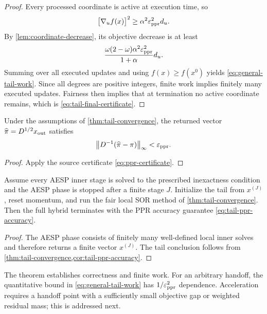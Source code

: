 \begin{proof}
Every processed coordinate is active at execution time, so
\begin{equation}
    \bigl[\nabla_u f(x)\bigr]^2\geq\alpha^2\varepsilon_{\mathrm{ppr}}^2d_u.
    \label{eq:active-square}
\end{equation}
By \cref{lem:coordinate-decrease}, its objective decrease is at least
\[
    \frac{\omega(2-\omega)\alpha^2\varepsilon_{\mathrm{ppr}}^2}{1+\alpha}d_u.
\]
Summing over all executed updates and using \(f(x)\geq f(x^0)\) yields
\cref{eq:general-tail-work}.  Since all degrees are positive integers, finite
work implies finitely many executed updates.  Fairness then implies that at
termination no active coordinate remains, which is
\cref{eq:tail-final-certificate}.
\end{proof}

\begin{corollary}
\label{cor:tail-ppr-accuracy}
Under the assumptions of \cref{thm:tail-convergence}, the returned vector
\(\widehat\pi=D^{1/2}x_{\rm out}\) satisfies
\begin{equation}
    \left\lVert D^{-1}(\widehat\pi-\pi)\right\rVert_\infty<\varepsilon_{\mathrm{ppr}}.
    \label{eq:tail-ppr-accuracy}
\end{equation}
\end{corollary}

\begin{proof}
Apply the source certificate \cref{eq:ppr-certificate}.
\end{proof}

\begin{theorem}
\label{thm:hybrid-convergence}
Assume every AESP inner stage is solved to the prescribed inexactness
condition and the AESP phase is stopped after a finite stage \(J\).  Initialize
the tail from \(x^{(J)}\), reset momentum, and run the fair local SOR method of
\cref{thm:tail-convergence}.  Then the full hybrid terminates with the PPR
accuracy guarantee \cref{eq:tail-ppr-accuracy}.
\end{theorem}

\begin{proof}
The AESP phase consists of finitely many well-defined local inner solves and
therefore returns a finite vector \(x^{(J)}\).  The tail conclusion follows
from \cref{thm:tail-convergence,cor:tail-ppr-accuracy}.
\end{proof}

\begin{remark}
The theorem establishes correctness and finite work.  For an arbitrary
handoff, the quantitative bound in \cref{eq:general-tail-work} has
\(1/\varepsilon_{\mathrm{ppr}}^2\) dependence.  Acceleration requires a handoff point with a
sufficiently small objective gap or weighted residual mass; this is addressed
next.
\end{remark}
